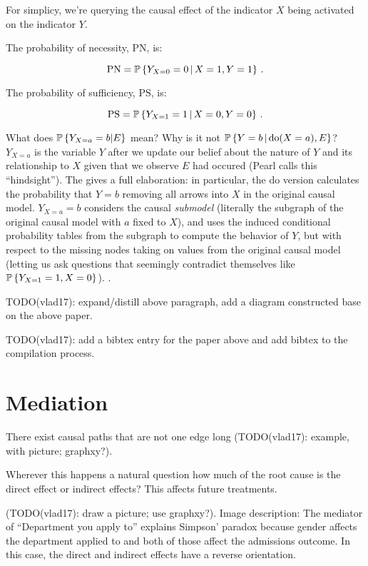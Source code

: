 \documentclass{article}
\begin{document}
For simplicy, we're querying the causal effect of the indicator $X$ being activated on the indicator $Y$.

The probability of necessity, $\textrm{PN}$, is:

$$
\textrm{PN}=\operatorname{\mathbb{P}}\left\{ Y_{X=0}=0 \,\middle|\, X=1,Y=1 \right\}\,.
$$

The probability of sufficiency, $\textrm{PS}$, is:

$$
\textrm{PS}=\operatorname{\mathbb{P}}\left\{ Y_{X=1}=1 \,\middle|\, X=0,Y=0 \right\}\,.
$$

What does $\operatorname{\mathbb{P}}\left\{{Y_{X=a}=b|E}\right\}$ mean? Why is it not $\operatorname{\mathbb{P}}\left\{ Y=b \,\middle|\, \mathrm{do}(X=a), E \right\}$? $Y_{X=a}$ is the variable $Y$ after we update our belief about the nature of $Y$ and its relationship to $X$ given that we observe $E$ had occured (Pearl calls this ``hindsight''). The  gives a full elaboration: in particular, the $\mathrm{do}$ version calculates the probability that $Y=b$ removing all arrows into $X$ in the original causal model. $Y_{X=a}=b$ considers the causal \textit{submodel} (literally the subgraph of the original causal model with $a$ fixed to $X$), and uses the induced conditional probability tables from the subgraph to compute the behavior of $Y$, but with respect to the missing nodes taking on values from the original causal model (letting us ask questions that seemingly contradict themselves like $\operatorname{\mathbb{P}}\left\{{Y_{X=1}=1, X=0}\right\}$). \cite{pearl1999probabilities}.

TODO(vlad17): expand/distill above paragraph, add a diagram constructed base on the above paper.

TODO(vlad17): add a bibtex entry for the paper above and add bibtex to the compilation process.

\section{Mediation}

There exist causal paths that are not one edge long (TODO(vlad17): example, with picture; graphxy?).

Wherever this happens a natural question how much of the root cause is the direct effect or indirect effects? This affects future treatments.

(TODO(vlad17): draw a picture; use graphxy?). Image description: The mediator of ``Department you apply to'' explains Simpson' paradox because gender affects the department applied to and both of those affect the admissions outcome. In this case, the direct and indirect effects have a reverse orientation.
\end{document}
